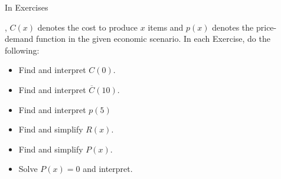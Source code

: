 {\noindent In Exercises}
{, $C(x)$ denotes the cost to produce $x$ items and $p(x)$ denotes the price-demand function in the given economic scenario.  In each Exercise, do the following:

\begin{itemize}
\item  Find and interpret $C(0)$.
\item  Find and interpret $\overline{C}(10)$.
\item  Find and interpret $p(5)$
\item  Find and simplify $R(x)$.
\item  Find and simplify $P(x)$.
\item  Solve $P(x) = 0$ and interpret.
\end{itemize}
}
